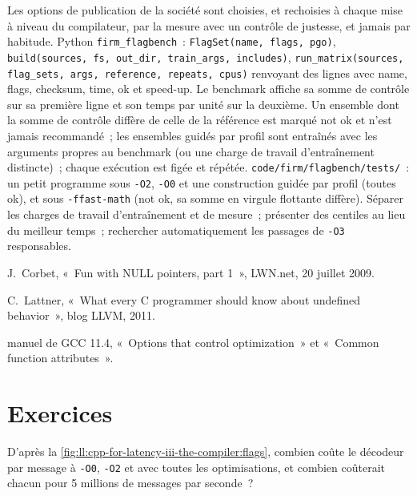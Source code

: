 \begin{build}
 Les options de publication de la société sont choisies, et rechoisies à chaque mise à niveau du compilateur, par la mesure avec un
contrôle de justesse, et jamais par habitude.
 Python \texttt{firm\_flagbench}~: \texttt{FlagSet(name, flags, pgo)},
\texttt{build(sources, fs, out\_dir, train\_args, includes)}, \texttt{run\_matrix(sources, flag\_sets, args, reference, repeats, cpus)} renvoyant
des lignes avec name, flags, checksum, time, ok et speed-up. Le benchmark affiche sa somme de contrôle sur sa première ligne et son temps
par unité sur la deuxième.
 Un ensemble dont la somme de contrôle diffère de celle de la référence est marqué not ok et n'est jamais recommandé~; les ensembles guidés par profil
sont entraînés avec les arguments propres au benchmark (ou une charge de travail d'entraînement distincte)~; chaque exécution est figée et répétée.
 \texttt{code/firm/flagbench/tests/}~: un petit programme sous \texttt{-O2}, \texttt{-O0} et une construction guidée par profil
(toutes ok), et sous \texttt{-ffast-math} (not ok, sa somme en virgule flottante diffère).
 Séparer les charges de travail d'entraînement et de mesure~; présenter des centiles au lieu du meilleur temps~;
rechercher automatiquement les passages de \texttt{-O3} responsables.
\end{build}

\begin{omsources}
\item J.~Corbet, «~Fun with NULL pointers, part 1~», LWN.net, 20 juillet 2009.
\item C.~Lattner, «~What every C programmer should know about undefined behavior~», blog LLVM, 2011.
\item manuel de GCC 11.4, «~Options that control optimization~» et «~Common function attributes~».
\end{omsources}

\section{Exercices}

\begin{exercise}[$\star$]\label{exo:ll:cpp-for-latency-iii-the-compiler:1}
D'après la \cref{fig:ll:cpp-for-latency-iii-the-compiler:flags}, combien coûte le décodeur par message à \texttt{-O0},
\texttt{-O2} et avec toutes les optimisations, et combien coûterait chacun pour 5 millions de messages par seconde~?
\end{exercise}

